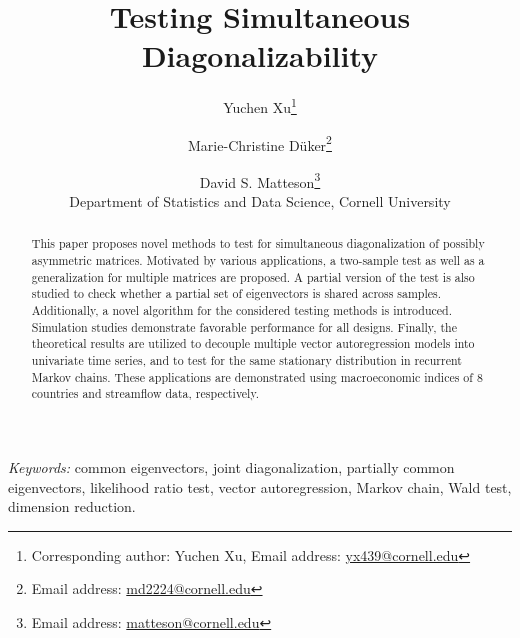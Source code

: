 \documentclass[12pt]{article}
\numberwithin{thm}{section}
\numberwithin{defn}{section}
\numberwithin{lem}{section}
\numberwithin{prop}{section}
\numberwithin{cor}{section}
\numberwithin{rem}{section}
\begin{document}
%

\def\spacingset#1{\renewcommand{\baselinestretch}%
{#1}\small\normalsize} \spacingset{1}




  \title{\LARGE\bf Testing Simultaneous Diagonalizability}
  \author{Yuchen Xu\thanks{Corresponding author: Yuchen Xu, Email address: \href{mailto:yx439@cornell.edu}{yx439@cornell.edu}}
    \and
    Marie-Christine D\"uker\thanks{Email address: \href{mailto:md2224@cornell.edu}{md2224@cornell.edu}}
    \and
    David S. Matteson\thanks{Email address: \href{mailto:matteson@cornell.edu}{matteson@cornell.edu}}
    \hspace{.7cm}\\
    Department of Statistics and Data Science, Cornell University}
  \maketitle





\bigskip
\begin{abstract}
This paper proposes novel methods to test for simultaneous diagonalization of possibly asymmetric matrices. Motivated by various applications, a two-sample test as well as a generalization for multiple matrices are proposed. A partial version of the test is also studied to check whether a partial set of eigenvectors is shared across samples. Additionally, a novel algorithm for the considered testing methods is introduced. Simulation studies demonstrate favorable performance for all designs. 
Finally, the theoretical results are utilized to decouple multiple vector autoregression models into univariate time series, and to test for the same stationary distribution in recurrent Markov chains.
These applications are demonstrated using macroeconomic indices of 8 countries and streamflow data, respectively.
\end{abstract}

\noindent%
{\it Keywords:}  
common eigenvectors, joint diagonalization, partially common eigenvectors, likelihood ratio test, vector autoregression, Markov chain, Wald test, dimension reduction.
\vfill




\newpage
\spacingset{1.9}
\end{document}
